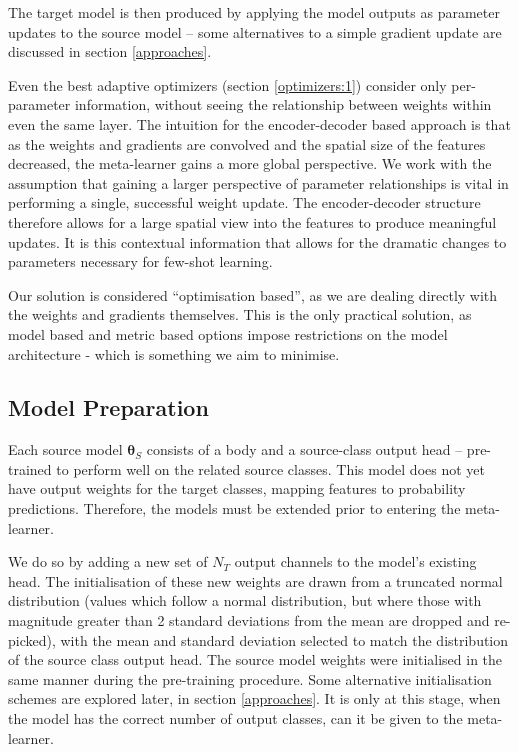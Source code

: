 \documentclass{report}
\begin{document}
The target model is then produced by applying the model outputs as parameter updates to the source model -- some alternatives to a simple gradient update are discussed in section \ref{approaches}. \par
Even the best adaptive optimizers (section \ref{optimizers:1}) consider only per-parameter information, without seeing the relationship between weights within even the same layer. The intuition for the encoder-decoder based approach is that as the weights and gradients are convolved and the spatial size of the features decreased, the meta-learner gains a more global perspective. We work with the assumption that gaining a larger perspective of parameter relationships is vital in performing a single, successful weight update. The encoder-decoder structure therefore allows for a large spatial view into the features to produce meaningful updates. It is this contextual information that allows for the dramatic changes to parameters necessary for few-shot learning. \par
Our solution is considered ``optimisation based'', as we are dealing directly with the weights and gradients themselves. This is the only practical solution, as model based and metric based options impose restrictions on the model architecture - which is something we aim to minimise. \par




\subsection{Model Preparation}
Each source model $\bm{\theta}_S$ consists of a body and a source-class output head -- pre-trained to perform well on the related source classes. This model does not yet have output weights for the target classes, mapping features to probability predictions. Therefore, the models must be extended prior to entering the meta-learner. \par
We do so by adding a new set of $N_T$ output channels to the model's existing head. The initialisation of these new weights are drawn from a truncated normal distribution (values which follow a normal distribution, but where those with magnitude greater than 2 standard deviations from the mean are dropped and re-picked), with the mean and standard deviation selected to match the distribution of the source class output head. The source model weights were initialised in the same manner during the pre-training procedure. Some alternative initialisation schemes are explored later, in section \ref{approaches}. It is only at this stage, when the model has the correct number of output classes, can it be given to the meta-learner. \par
\end{document}
